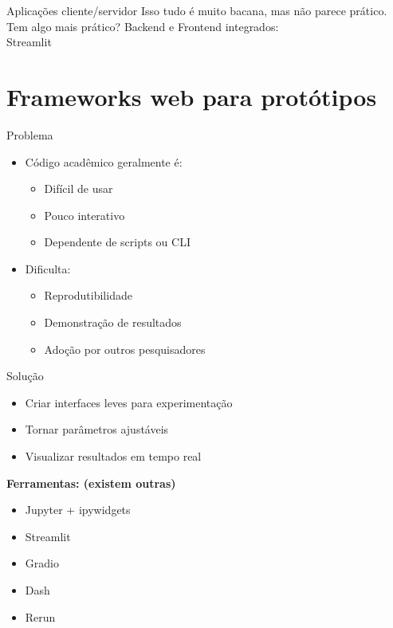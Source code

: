 \documentclass{beamer}
\begin{document}
\begin{frame}{Aplicações cliente/servidor}
    \centering
    Isso tudo é muito bacana, mas não parece prático. Tem algo mais prático? \pause
    \huge{Backend e Frontend integrados:\\ Streamlit}
\end{frame}


\section{Frameworks web para protótipos}
\begin{frame}{Problema}
\begin{itemize}
    \item Código acadêmico geralmente é:
    \begin{itemize}
        \item Difícil de usar
        \item Pouco interativo
        \item Dependente de scripts ou CLI
    \end{itemize}
    \item Dificulta:
    \begin{itemize}
        \item Reprodutibilidade
        \item Demonstração de resultados
        \item Adoção por outros pesquisadores
    \end{itemize}
\end{itemize}
\end{frame}

\begin{frame}{Solução}
\begin{itemize}
    \item Criar interfaces leves para experimentação
    \item Tornar parâmetros ajustáveis
    \item Visualizar resultados em tempo real
\end{itemize}

\vspace{0.3cm}

\textbf{Ferramentas: (existem outras)}
\begin{itemize}
    \item Jupyter + ipywidgets
    \item Streamlit
    \item Gradio
    \item Dash
    \item Rerun
\end{itemize}
\end{frame}
\end{document}
